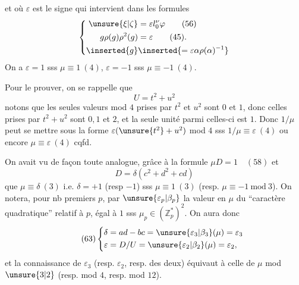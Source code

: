 et où $\varepsilon$ est le signe qui intervient dans les formules
\[
\left\{\begin{aligned}
\unsure{\xi|\zeta}&=\varepsilon l_0^\nu\varphi\qquad(56)\\
g\rho(g)\rho^2(g)&=\varepsilon\qquad(45).\\
\inserted{g}&\inserted{=\varepsilon\alpha\rho(\alpha)^{-1}}
\end{aligned}\right.
\]
On a $\varepsilon=1$ sss $\mu\equiv1\ (4)$, $\varepsilon=-1$ sss $\mu\equiv-1\ (4)$.


Pour le prouver, on se rappelle que
\[
U=t^2+u^2
\]
notons que les seules valeurs mod $4$ prises par $t^2$ et $u^2$ sont $0$ et $1$, donc celles prises par $t^2+u^2$ sont $0,1$ et $2$, et la seule unité parmi celles-ci est $1$. Donc \deleted{\unsure{$\mu$}} $1/\mu$ peut se mettre sous la forme $\varepsilon(\unsure{t^2}+u^2)$ mod $4$ sss $1/\mu\equiv\varepsilon\ (4)$ ou encore $\mu\equiv\varepsilon\ (4)$ cqfd.

 On avait vu de façon toute analogue, grâce à la formule $\mu D=1\quad(58)$ et
\[
D=\delta(c^2+d^2+cd)
\]
que $\mu\equiv\delta\ (3)$ i.e. $\delta=+1$ (resp $-1$) sss $\mu\equiv1\ (3)$ (resp. $\mu\equiv-1\ \mathrm{mod}\ 3$). On  notera, pour  nb premiers $p$, par $\unsure{\varepsilon_p|\beta_p}$ la valeur en $\mu$ du ``caractère quadratique'' relatif à $p$, égal à $1$ sss $\mu_p\in(\mathbb Z_p^*)^2$. On aura donc
\[
\tag{63}
\left\{\begin{aligned}
\delta&=ad-bc=\unsure{\varepsilon_3|\beta_3}(\mu)=\varepsilon_3\\
\varepsilon&=D/U=\unsure{\varepsilon_2|\beta_2}(\mu)=\varepsilon_2,
\end{aligned}\right.
\]
et la connaissance de $\varepsilon_3$ (resp. $\varepsilon_2$, resp. des deux) équivaut à celle de $\mu$ mod $\unsure{3|2}$ (resp. mod $4$, resp. mod $12$).


